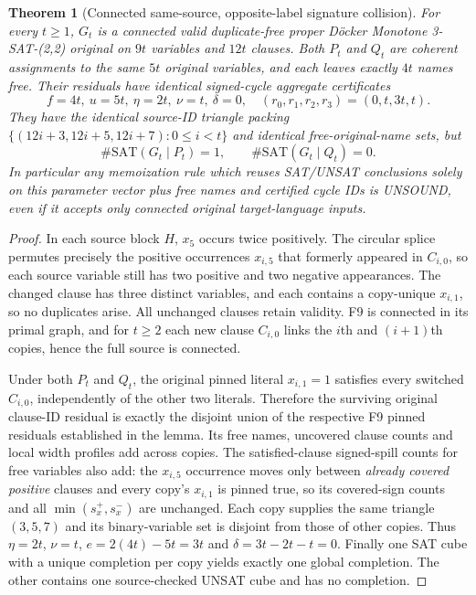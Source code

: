 \documentclass[11pt]{article}
\newtheorem{theorem}{Theorem}
\begin{document}
\begin{theorem}[Connected same-source, opposite-label signature collision]\label{thm:collision}
For every $t\ge1$, $G_t$ is a connected valid duplicate-free proper D\"ocker Monotone 3-SAT-(2,2) original on $9t$ variables and $12t$ clauses. Both $P_t$ and $Q_t$ are coherent assignments to the same $5t$ original variables, and each leaves exactly $4t$ names free. Their residuals have \emph{identical} signed-cycle aggregate certificates
\[
\boxed{f=4t,\ u=5t,\ \eta=2t,\ \nu=t,\ \delta=0,\quad
(r_0,r_1,r_2,r_3)=(0,t,3t,t).}
\]
They have the identical source-ID triangle packing $\{(12i+3,12i+5,12i+7):0\le i<t\}$ and identical free-original-name sets, but
\[
\boxed{\#\mathrm{SAT}(G_t\mid P_t)=1,\qquad
\#\mathrm{SAT}(G_t\mid Q_t)=0.}
\]
In particular any memoization rule which reuses SAT/UNSAT conclusions solely on this parameter vector plus free names and certified cycle IDs is UNSOUND, even if it accepts only connected original target-language inputs.
\end{theorem}
\begin{proof}
In each source block $H$, $x_5$ occurs twice positively. The circular splice permutes precisely the positive occurrences $x_{i,5}$ that formerly appeared in $C_{i,0}$, so each source variable still has two positive and two negative appearances. The changed clause has three distinct variables, and each contains a copy-unique $x_{i,1}$, so no duplicates arise. All unchanged clauses retain validity. F9 is connected in its primal graph, and for $t\ge2$ each new clause $C_{i,0}$ links the $i$th and $(i+1)$th copies, hence the full source is connected.

Under both $P_t$ and $Q_t$, the original pinned literal $x_{i,1}=1$ satisfies every switched $C_{i,0}$, independently of the other two literals. Therefore the surviving original clause-ID residual is exactly the disjoint union of the respective F9 pinned residuals established in the lemma. Its free names, uncovered clause counts and local width profiles add across copies. The satisfied-clause signed-spill counts for free variables also add: the $x_{i,5}$ occurrence moves only between \emph{already covered positive} clauses and every copy's $x_{i,1}$ is pinned true, so its covered-sign counts and all $\min(s_x^+,s_x^-)$ are unchanged. Each copy supplies the same triangle $(3,5,7)$ and its binary-variable set is disjoint from those of other copies. Thus $\eta=2t$, $\nu=t$, $e=2(4t)-5t=3t$ and $\delta=3t-2t-t=0$. Finally one SAT cube with a unique completion per copy yields exactly one global completion. The other contains one source-checked UNSAT cube and has no completion.\end{proof}
\end{document}

